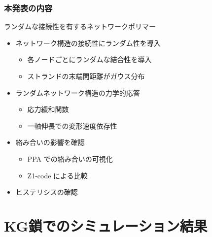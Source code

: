 \documentclass[12pt, dvipdfmx]{beamer}
\begin{document}
\begin{frame}
	\frametitle{本発表の内容}
		\begin{exampleblock}{ランダムな接続性を有するネットワークポリマー}
			\begin{itemize}
				\item ネットワーク構造の接続性にランダム性を導入
				\begin{itemize}
					\item 各ノードごとにランダムな結合性を導入
					\item ストランドの末端間距離がガウス分布
				\end{itemize}
			\item ランダムネットワーク構造の力学的応答
				\begin{itemize}
					\item 応力緩和関数
					\item 一軸伸長での変形速度依存性
				\end{itemize}
				\item 絡み合いの影響を確認
				\begin{itemize}
					\item PPA での絡み合いの可視化
					\item Z1-code による比較
				\end{itemize}
				\item ヒステリシスの確認
			\end{itemize}
		\end{exampleblock}
\end{frame}

\section{KG鎖でのシミュレーション結果}
\end{document}
